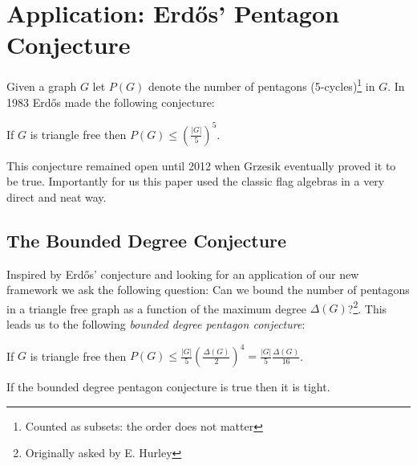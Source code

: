 \chapter{Application: Erd\H{o}s' Pentagon Conjecture}
\label{chap:pentagon_conjecture}

Given a graph $G$ let $P(G)$ denote the number of pentagons (5-cycles)\footnote{Counted as
subsets: the order does not matter} in $G$.
In 1983 \cite{erdosProblemsGraphTheory1984} Erd\H{o}s made the following conjecture:

\begin{knownconjecture}
    If $G$ is triangle free then $P(G) \leq \left(\frac{|G|}{5}\right)^5$.
\end{knownconjecture}

This conjecture remained open until 2012 when Grzesik
\cite{grzesikMaximumNumberFivecycles2012} eventually proved it to be true. Importantly
for us this paper used the classic flag algebras in a very direct and neat way.

\section{The Bounded Degree Conjecture}

Inspired by Erd\H{o}s' conjecture and looking for an application of our new framework we ask
the following question: Can we bound the number of pentagons in a triangle free graph
as a function of the maximum degree $\Delta(G)$?\footnote{Originally asked by E. Hurley}.
This leads us to the following \textit{bounded degree pentagon conjecture}:

\begin{conjecture}
    \label{conj:bounded_pentagon}
    If $G$ is triangle free then 
    $P(G) \leq \frac{|G|}{5}\left(\frac{\Delta(G)}{2}\right)^4=\frac{|G|}{5}\frac{\Delta(G)}{16}$.
\end{conjecture}

\begin{lemma}
    If the bounded degree pentagon conjecture is true then it is tight.
\end{lemma}

